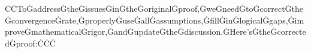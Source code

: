 ĊĊToĠaddressĠtheĠissuesĠinĠtheĠoriginalĠproof,ĠweĠneedĠtoĠcorrectĠtheĠconvergenceĠrate,ĠproperlyĠuseĠallĠassumptions,ĠfillĠinĠlogicalĠgaps,ĠimproveĠmathematicalĠrigor,ĠandĠupdateĠtheĠdiscussion.ĠHere'sĠtheĠcorrectedĠproof:ĊĊĊ%